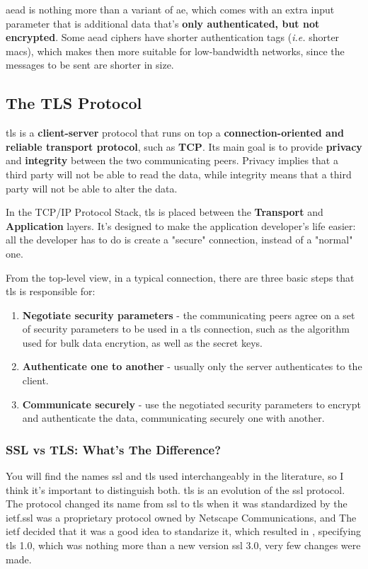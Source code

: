 \documentclass{llncs}
\begin{document}
\gls{aead} is nothing more than a variant of \gls{ae}, which comes with an extra
input parameter that is additional data that's \textbf{only authenticated, but not encrypted}.
Some \gls{aead} ciphers have shorter authentication tags (\textit{i.e.} shorter \gls{mac}s),
which makes then more suitable for low-bandwidth networks, since the messages to be sent
are shorter in size.


\subsection{The TLS Protocol}

\gls{tls} is a \textbf{client-server} protocol
that runs on top a \textbf{connection-oriented and reliable transport protocol},
such as \textbf{TCP}. Its main goal is to provide \textbf{privacy} and \textbf{integrity}
between the two communicating peers. Privacy implies that a third party will not
be able to read the data, while integrity means that a third party will not be
able to alter the data.

In the TCP/IP Protocol Stack, \gls{tls} is placed between the \textbf{Transport}
and \textbf{Application} layers. It's designed to make the application developer's
life easier: all the developer has to do is create a "secure" connection, instead
of a "normal" one.

From the top-level view, in a typical connection, there are three basic steps
that \gls{tls} is responsible for:
\begin{enumerate}
  \item \textbf{Negotiate security parameters} - the communicating peers agree on
  a set of security parameters to be used in a \gls{tls} connection, such as the
  algorithm used for bulk data encrytion, as well as the secret keys.
  \item \textbf{Authenticate one to another} - usually only the server authenticates
  to the client.
  \item \textbf{Communicate securely} - use the negotiated security parameters
  to encrypt and authenticate the data, communicating securely one with another.
\end{enumerate}


\subsubsection{SSL vs TLS: What's The Difference?}
You will find the names \gls{ssl} and \gls{tls} used interchangeably in the literature,
so I think it's important to distinguish both. \gls{tls} is an evolution of the \gls{ssl} protocol. The protocol changed
its name from \gls{ssl} to \gls{tls} when it was
standardized by the \gls{ietf}.\gls{ssl}
was a proprietary protocol owned by Netscape Communications, and The \gls{ietf}
decided that it was a good idea to standarize it, which resulted in  \cite{RFC2246},
specifying \gls{tls} 1.0, which was nothing more than a new version \gls{ssl} 3.0,
very few changes were made.
%
\end{document}
